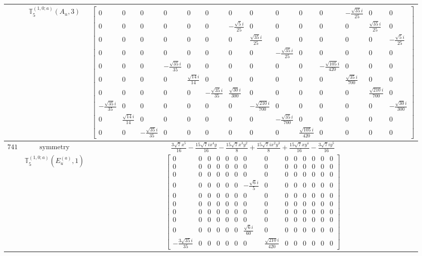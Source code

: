 \documentclass[fleqn,8pt,landscape]{jsarticle}
\begin{document}
\begin{longtable}{ccc}
$  $ & $ \mathbb{T}_{5}^{(1,0;a)}(A_{u},3) $ & $ \begin{bmatrix} 0 & 0 & 0 & 0 & 0 & 0 & 0 & 0 & 0 & 0 & 0 & - \frac{\sqrt{35} i}{25} & 0 & 0 \\ 0 & 0 & 0 & 0 & 0 & 0 & - \frac{\sqrt{5} i}{25} & 0 & 0 & 0 & 0 & 0 & \frac{\sqrt{35} i}{25} & 0 \\ 0 & 0 & 0 & 0 & 0 & 0 & 0 & \frac{\sqrt{35} i}{25} & 0 & 0 & 0 & 0 & 0 & - \frac{\sqrt{5} i}{25} \\ 0 & 0 & 0 & 0 & 0 & 0 & 0 & 0 & - \frac{\sqrt{35} i}{25} & 0 & 0 & 0 & 0 & 0 \\ 0 & 0 & 0 & - \frac{\sqrt{35} i}{35} & 0 & 0 & 0 & 0 & 0 & 0 & - \frac{\sqrt{105} i}{420} & 0 & 0 & 0 \\ 0 & 0 & 0 & 0 & \frac{\sqrt{14} i}{14} & 0 & 0 & 0 & 0 & 0 & 0 & \frac{\sqrt{35} i}{700} & 0 & 0 \\ 0 & 0 & 0 & 0 & 0 & - \frac{\sqrt{35} i}{35} & \frac{\sqrt{30} i}{300} & 0 & 0 & 0 & 0 & 0 & \frac{\sqrt{210} i}{700} & 0 \\ - \frac{\sqrt{35} i}{35} & 0 & 0 & 0 & 0 & 0 & 0 & - \frac{\sqrt{210} i}{700} & 0 & 0 & 0 & 0 & 0 & - \frac{\sqrt{30} i}{300} \\ 0 & \frac{\sqrt{14} i}{14} & 0 & 0 & 0 & 0 & 0 & 0 & - \frac{\sqrt{35} i}{700} & 0 & 0 & 0 & 0 & 0 \\ 0 & 0 & - \frac{\sqrt{35} i}{35} & 0 & 0 & 0 & 0 & 0 & 0 & \frac{\sqrt{105} i}{420} & 0 & 0 & 0 & 0 \end{bmatrix} $ \\ \hline
$ 741 $ & $ \text{symmetry} $ & $ \frac{3 \sqrt{7} x^{5}}{16} - \frac{15 \sqrt{7} i x^{4} y}{16} - \frac{15 \sqrt{7} x^{3} y^{2}}{8} + \frac{15 \sqrt{7} i x^{2} y^{3}}{8} + \frac{15 \sqrt{7} x y^{4}}{16} - \frac{3 \sqrt{7} i y^{5}}{16} $ \\
$  $ & $ \mathbb{T}_{5}^{(1,0;a)}(E_{u}^{(a)},1) $ & $ \begin{bmatrix} 0 & 0 & 0 & 0 & 0 & 0 & 0 & 0 & 0 & 0 & 0 & 0 & 0 & 0 \\ 0 & 0 & 0 & 0 & 0 & 0 & 0 & 0 & 0 & 0 & 0 & 0 & 0 & 0 \\ 0 & 0 & 0 & 0 & 0 & 0 & 0 & 0 & 0 & 0 & 0 & 0 & 0 & 0 \\ 0 & 0 & 0 & 0 & 0 & 0 & - \frac{\sqrt{6} i}{5} & 0 & 0 & 0 & 0 & 0 & 0 & 0 \\ 0 & 0 & 0 & 0 & 0 & 0 & 0 & 0 & 0 & 0 & 0 & 0 & 0 & 0 \\ 0 & 0 & 0 & 0 & 0 & 0 & 0 & 0 & 0 & 0 & 0 & 0 & 0 & 0 \\ 0 & 0 & 0 & 0 & 0 & 0 & 0 & 0 & 0 & 0 & 0 & 0 & 0 & 0 \\ 0 & 0 & 0 & 0 & 0 & 0 & 0 & 0 & 0 & 0 & 0 & 0 & 0 & 0 \\ 0 & 0 & 0 & 0 & 0 & 0 & \frac{\sqrt{6} i}{60} & 0 & 0 & 0 & 0 & 0 & 0 & 0 \\ - \frac{3 \sqrt{35} i}{35} & 0 & 0 & 0 & 0 & 0 & 0 & \frac{\sqrt{210} i}{420} & 0 & 0 & 0 & 0 & 0 & 0 \end{bmatrix} $ \\ \hline

\end{longtable}
\end{document}
